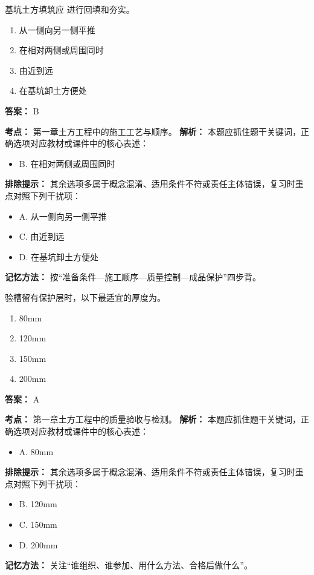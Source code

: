 \documentclass[UTF8,fontset=fandol,11pt]{ctexart}
\begin{document}
\begin{quizbox}[title={第 21 题}]
基坑土方填筑应 进行回填和夯实。\\
\begin{enumerate}[label=\Alph*.]
\item 从一侧向另一侧平推
\item 在相对两侧或周围同时
\item 由近到远
\item 在基坑卸土方便处
\end{enumerate}
\textbf{答案：} B
\vspace{0.25em}
\begin{answerbox}[title={考点解析}]
\textbf{考点：} 第一章土方工程中的施工工艺与顺序。
\textbf{解析：} 本题应抓住题干关键词，正确选项对应教材或课件中的核心表述：
\begin{itemize}
\item B. 在相对两侧或周围同时
\end{itemize}
\textbf{排除提示：} 其余选项多属于概念混淆、适用条件不符或责任主体错误，复习时重点对照下列干扰项：
\begin{itemize}
\item A. 从一侧向另一侧平推
\item C. 由近到远
\item D. 在基坑卸土方便处
\end{itemize}
\textbf{记忆方法：} 按“准备条件—施工顺序—质量控制—成品保护”四步背。
\end{answerbox}
\end{quizbox}

\vspace{0.2em}

\begin{quizbox}[title={第 22 题}]
验槽留有保护层时，以下最适宜的厚度为。\\
\begin{enumerate}[label=\Alph*.]
\item 80mm
\item 120mm
\item 150mm
\item 200mm
\end{enumerate}
\textbf{答案：} A
\vspace{0.25em}
\begin{answerbox}[title={考点解析}]
\textbf{考点：} 第一章土方工程中的质量验收与检测。
\textbf{解析：} 本题应抓住题干关键词，正确选项对应教材或课件中的核心表述：
\begin{itemize}
\item A. 80mm
\end{itemize}
\textbf{排除提示：} 其余选项多属于概念混淆、适用条件不符或责任主体错误，复习时重点对照下列干扰项：
\begin{itemize}
\item B. 120mm
\item C. 150mm
\item D. 200mm
\end{itemize}
\textbf{记忆方法：} 关注“谁组织、谁参加、用什么方法、合格后做什么”。
\end{answerbox}
\end{quizbox}
\end{document}
